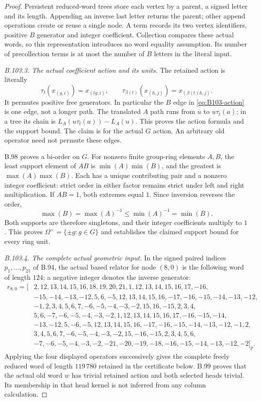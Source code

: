 \begin{proof}
Persistent reduced-word trees store each vertex by a parent,
a signed letter and its length. Appending an inverse last letter
returns the parent; other append operations create or reuse a
single node. A term records its two vertex identifiers, positive
$B$ generator and integer coefficient. Collection compares these
actual words, so this representation introduces no word equality
assumption. Its number of precollection terms is at most the
number of $B$ letters in the literal input.

\emph{B.103.3. The actual coefficient action and its units.}
The retained action is literally
\[
 \tau_t(x_{(g,i)})=x_{(tg,i)},
 \qquad \tau_{\beta(t)}(x_{(h,j)})=x_{(\beta(t)h,j)}.
\]
It permutes positive free generators. In particular the $B$ edge
in \eqref{eq:B103-action} is one edge, not a longer path.
The translated $A$ path runs from $u$ to $u\tau_t(a)$; in a tree
its chain is $L_A(u\tau_t(a))-L_A(u)$. This proves the action
formula and the support bound. The claim is for the actual $G$
action. An arbitrary old operator need not permute these edges.

B.98 proves a bi-order on $G$. For nonzero finite group-ring
elements $A,B$, the least support element of $AB$ is
$\min(A)\min(B)$, and the greatest is $\max(A)\max(B)$.
Each has a unique contributing pair and a nonzero integer
coefficient: strict order in either factor remains strict under
left and right multiplication. If $AB=1$, both extremes equal
$1$. Since inversion reverses the order,
\[
 \max(B)=\max(A)^{-1}\le\min(A)^{-1}=\min(B).
\]
Both supports are therefore singletons, and their integer
coefficients multiply to $1$. This proves
$\Omega^\times=\{\pm g:g\in G\}$ and establishes the claimed
support bound for every ring unit.

\emph{B.103.4. The complete actual geometric input.}
In the signed paired indices $p_1,\ldots,p_{21}$ of B.94, the
actual based relator for node $(8,0)$ is the following word of
length $124$; a negative integer denotes the inverse generator:
\begingroup\small
\[
 \begin{aligned}
 r_{8,0}=[&2,12,13,14,15,16,18,19,20,21,1,12,13,14,15,16,17,-16,\\
 &-15,-14,-13,-12,5,6,-5,12,13,14,15,16,-17,-16,-15,-14,-13,-12,\\
 &-1,2,3,4,5,6,7,-6,-5,-4,-3,-2,15,16,-15,2,3,4,\\
 &5,6,-7,-6,-5,-4,-3,-2,1,12,13,14,15,16,17,-16,-15,-14,\\
 &-13,-12,5,-6,-5,12,13,14,15,16,-17,-16,-15,-14,-13,-12,-1,2,\\
 &3,4,5,6,7,-6,-5,-4,-3,-2,15,-16,-15,2,3,4,5,6,\\
 &-7,-6,-5,-4,-3,-2,-21,-20,-19,-18,-16,-15,-14,-13,-12,-2]_{p}.
 \end{aligned}
\]
\endgroup
Applying the four displayed operators successively gives the
complete freely reduced word of length $119\,780$ retained in
the certificate below. B.99 proves that the actual old word $w$
has trivial retained action and both selected heads trivial.
Its membership in that head kernel is not inferred from any
column calculation.


\end{proof}
